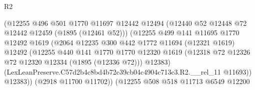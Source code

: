 \begin{lexlean}{R2}
\begin{coremodule}
                                        (@12255
                                          @496
                                          @501
                                          @1770
                                          @11697
                                          @12442
                                          @12494
                                          (@12440 @52 @12448 @72 @12442 @12459 (@1895 (@12461 @52)))
                                          (@12255
                                            @499
                                            @141
                                            @11695
                                            @1770
                                            @12492
                                            @1619
                                            (@2064
                                              @12235
                                              @300
                                              @442
                                              @1772
                                              @11694
                                              (@12321 @1619)
                                              @12492
                                              (@12255
                                                @440
                                                @141
                                                @1770
                                                @1770
                                                @12320
                                                @1619
                                                (@12318
                                                  @72
                                                  @12326
                                                  @72
                                                  @12320
                                                  @12334
                                                  (@1895 (@12336 @72)))
                                                @12383)
                                              (LexLeanPreserve.C57d2b4c8bd4b72c39cb04c4904c713c3.R2.__rel_11
                                                @11693))
                                            @12383))
                                        (@2918 @11700 @11702))
                                      (@12255
                                        @508
                                        @518
                                        @11713
                                        @6549
                                        @12200

\end{coremodule}
\end{lexlean}
